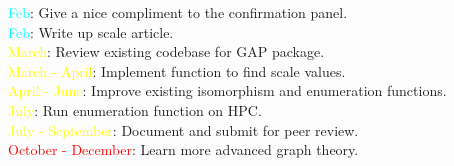 \documentclass[preview]{standalone}
\begin{document}
\textcolor{cyan}{Feb}: Give a nice compliment to the confirmation panel.\\\textcolor{cyan}{Feb}: Write up scale article.\\\textcolor{yellow}{March}: Review existing codebase for GAP package.\\\textcolor{yellow}{March - April}: Implement function to find scale values.\\\textcolor{yellow}{April - June}: Improve existing isomorphism and enumeration functions.\\\textcolor{yellow}{July}: Run enumeration function on HPC.\\\textcolor{yellow}{July - September}: Document and submit for peer review.\\\textcolor{red}{October - December}: Learn more advanced graph theory.\\
\end{document}
